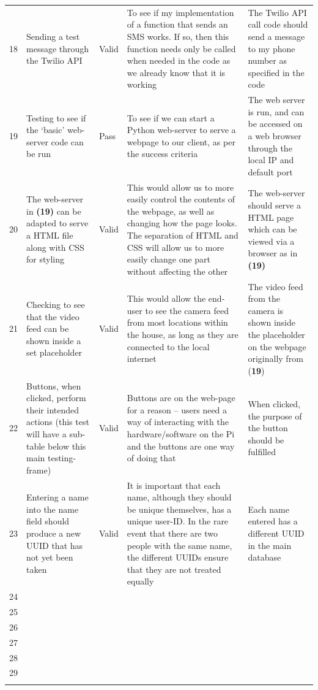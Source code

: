 \documentclass[9pt]{article}
\begin{document}
\begin{tabularx}{\textwidth}{lXlXX}
	18 & Sending a test message through the Twilio API & Valid & To see if my implementation of a function that sends an SMS works. If so, then this function needs only be called when needed in the code as we already know that it is working & The Twilio API call code should send a message to my phone number as specified in the code\\
	19 & Testing to see if the `basic' web-server code can be run & Pass & To see if we can start a Python web-server to serve a webpage to our client, as per the success criteria & The web server is run, and can be accessed on a web browser through the local IP and default port\\
	20 & The web-server in \textbf{(19)} can be adapted to serve a HTML file along with CSS for styling & Valid & This would allow us to more easily control the contents of the webpage, as well as changing how the page looks. The separation of HTML and CSS will allow us to more easily change one part without affecting the other & The web-server should serve a HTML page which can be viewed via a browser as in \textbf{(19)}\\
	21 & Checking to see that the video feed can be shown inside a set placeholder & Valid & This would allow the end-user to see the camera feed from most locations within the house, as long as they are connected to the local internet & The video feed from the camera is shown inside the placeholder on the webpage originally from (\textbf{19})\\
	22 & Buttons, when clicked, perform their intended actions (this test will have a sub-table below this main testing-frame) & Valid & Buttons are on the web-page for a reason -- users need a way of interacting with the hardware/software on the Pi and the buttons are one way of doing that & When clicked, the purpose of the button should be fulfilled \\
	23 & Entering a name into the name field should produce a new UUID that has not yet been taken & Valid & It is important that each name, although they should be unique themselves, has a unique user-ID. In the rare event that there are two people with the same name, the different UUIDs ensure that they are not treated equally & Each name entered has a different UUID in the main database \\
	24 & & & & \\
	25 & & & & \\
	26 & & & & \\
	27 & & & & \\
	28 & & & & \\
	29 & & & & \\ \bottomrule
\caption{A table showing the tests performed on the solution, with justification}\label{tab_testingDesignSolution}
\end{tabularx}
\end{document}
